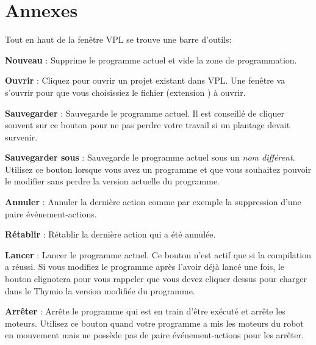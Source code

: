 \part{Annexes}

\label{a.toolbar}

Tout en haut de la fenêtre VPL se trouve une barre d'outils:

\begin{center}
\end{center}

\bigskip

\textbf{Nouveau} : Supprime le programme actuel et vide la zone de programmation.

\bigskip

\textbf{Ouvrir} : Cliquez pour ouvrir un projet existant dans VPL.
Une fenêtre va s'ouvrir pour que vous choisissiez le fichier (extension ) à ouvrir.

\bigskip

\textbf{Sauvegarder} : Sauvegarde le programme actuel.
Il est conseillé de cliquer souvent sur ce bouton pour ne pas perdre votre travail
si un plantage devait survenir.

\bigskip

\textbf{Sauvegarder sous} : Sauvegarde le programme actuel sous un 
\emph{nom différent}. Utilisez ce bouton lorsque vous avez un programme et que vous
souhaitez pouvoir le modifier sans perdre la version actuelle du programme.

\bigskip

\textbf{Annuler} : Annuler la dernière action comme par exemple la suppression
d'une paire événement-actions.\label{p.undo}

\bigskip

\textbf{Rétablir} : Rétablir la dernière action qui a été annulée.

\bigskip

\textbf{Lancer} : Lancer le programme actuel.
Ce bouton n'est actif que si la compilation a réussi.
Si vous modifiez le programme après l'avoir déjà lancé une fois,
le bouton clignotera pour vous rappeler que vous devez cliquer dessus
pour charger dans le Thymio la version modifiée du programme.

\bigskip

\textbf{Arrêter} : Arrête le programme qui est en train d'être exécuté et
arrête les moteurs. Utilisez ce bouton quand votre programme a mis les moteurs du robot
en mouvement mais ne possède pas de paire événement-actions pour les arrêter.

